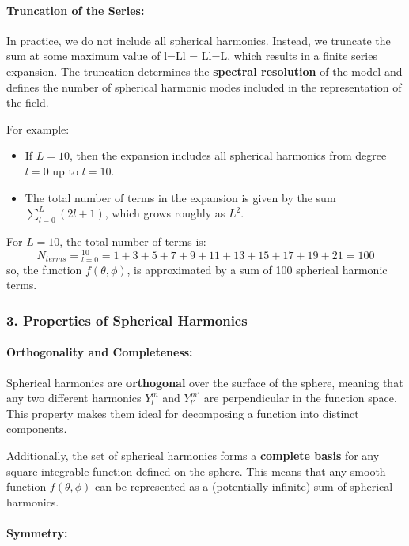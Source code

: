 \paragraph{\textbf{Truncation of the Series}:}

In practice, we do not include all spherical harmonics. Instead, we truncate the sum at some maximum value of l=Ll = Ll=L, which results in a finite series expansion. The truncation determines the \textbf{spectral resolution} of the model and defines the number of spherical harmonic modes included in the representation of the field.

For example:

\begin{itemize}
	\item If $L=10$, then the expansion includes all spherical harmonics from degree $l=0$ up to $l=10$.
	\item The total number of terms in the expansion is given by the sum $\displaystyle\sum_{l=0}^L(2l+1)$, which grows roughly as $L^2$.
\end{itemize}
For $L=10$, the total number of terms is:
$$N_{terms}=\displaystyle_{l=0}^{10}=1+3+5+7+9+11+13+15+17+19+21=100$$
so, the function $f(\theta,\phi)$, is approximated by a sum of 100 spherical harmonic terms.

\subsubsection{3. \textbf{Properties of Spherical Harmonics}}

\paragraph{\textbf{Orthogonality and Completeness}:}

Spherical harmonics are \textbf{orthogonal} over the surface of the sphere, meaning that any two different harmonics $Y_l^m$ and $Y_{l'}^{m'}$ are perpendicular in the function space. This property makes them ideal for decomposing a function into distinct components.

Additionally, the set of spherical harmonics forms a \textbf{complete basis} for any square-integrable function defined on the sphere. This means that any smooth function $f(\theta,\phi)$ can be represented as a (potentially infinite) sum of spherical harmonics.

\paragraph{\textbf{Symmetry}:}

